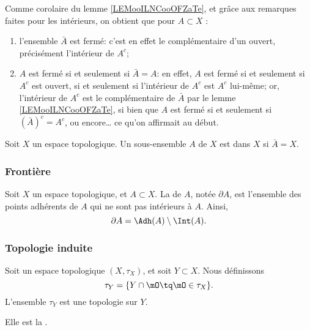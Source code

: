 \begin{remark}\label{RemAdhFerme}
	Comme corolaire du lemme \ref{LEMooILNCooOFZaTe}, et grâce aux remarques faites pour les intérieurs, on obtient que pour \( A \subset X \) :
	\begin{enumerate}
		\item l'ensemble \( \bar A \) est fermé: c'est en effet le complémentaire d'un ouvert, précisément l'intérieur de \( A^c \);
		\item \( A \) est fermé si et seulement si \( \bar A = A \): en effet, \( A \) est fermé si et seulement si \( A^c \) est ouvert, si et seulement si l'intérieur de \( A^c \) est \( A^c \) lui-même; or, l'intérieur de \( A^c \) est le complémentaire de \( \bar A \) par le lemme \ref{LEMooILNCooOFZaTe}, si bien que \( A \) est fermé si et seulement si \( (\bar A)^c  = A^c \), ou encore\dots{} ce qu'on affirmait au début.
	\end{enumerate}
\end{remark}

\begin{definition}\label{DefEnsembleDense}
	Soit \( X \) un espace topologique. Un sous-ensemble \( A \) de \( X \) est  dans \( X \) si \( \bar A = X\).
\end{definition}

\subsubsection{Frontière}

\begin{definition}
	Soit \( X \) un espace topologique, et \( A \subset X \). La  de \( A \), notée \( \partial A \), est l'ensemble des points adhérents de \( A \) qui ne sont pas intérieurs à \( A \). Ainsi,
	\begin{equation}
		\partial A = \Adh(A) \setminus \Int(A).
	\end{equation}
\end{definition}

\subsubsection{Topologie induite}

\begin{propositionDef} \label{DefVLrgWDB}
	Soit un espace topologique \( (X, \tau_X) \), et soit \( Y \subset X \). Nous définissons
	\begin{equation}
		\tau_Y=\{ Y\cap\mO\tq \mO\in\tau_X \}.
	\end{equation}
	L'ensemble \( \tau_Y\) est une topologie sur \( Y\).

	Elle est la .
\end{propositionDef}

